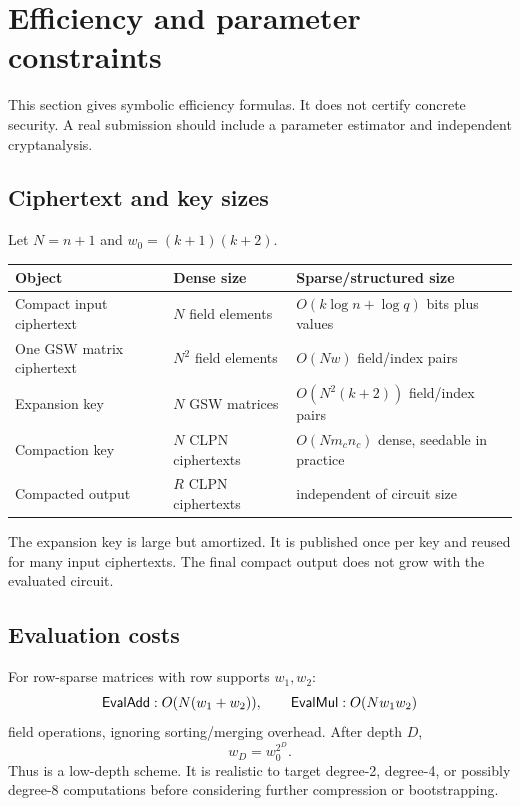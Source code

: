 \section{Efficiency and parameter constraints}

This section gives symbolic efficiency formulas.  It does not certify concrete security.  A real submission should include a parameter estimator and independent cryptanalysis.

\subsection{Ciphertext and key sizes}

Let $N=n+1$ and $w_0=(k+1)(k+2)$.

\begin{center}
\begin{tabular}{lll}
\toprule
Object & Dense size & Sparse/structured size\\
\midrule
Compact input ciphertext & $N$ field elements & $O(k\log n+\log q)$ bits plus values\\
One GSW matrix ciphertext & $N^2$ field elements & $O(Nw)$ field/index pairs\\
Expansion key & $N$ GSW matrices & $O(N^2(k+2))$ field/index pairs\\
Compaction key & $N$ CLPN ciphertexts & $O(Nm_cn_c)$ dense, seedable in practice\\
Compacted output & $R$ CLPN ciphertexts & independent of circuit size\\
\bottomrule
\end{tabular}
\end{center}

The expansion key is large but amortized.  It is published once per key and reused for many input ciphertexts.  The final compact output does not grow with the evaluated circuit.

\subsection{Evaluation costs}

For row-sparse matrices with row supports $w_1,w_2$:
\[
    \mathsf{EvalAdd}: O(N(w_1+w_2)),
    \qquad
    \mathsf{EvalMul}: O(Nw_1w_2)
\]
field operations, ignoring sorting/merging overhead.  After depth $D$,
\[
    w_D=w_0^{2^D}.
\]
Thus \sable{} is a low-depth scheme.  It is realistic to target degree-2, degree-4, or possibly degree-8 computations before considering further compression or bootstrapping.

